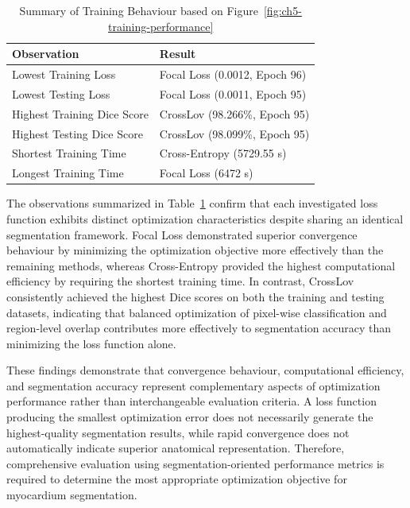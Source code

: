 \begin{table}[htbp]
	\centering
	\caption{Summary of Training Behaviour based on Figure~\ref{fig:ch5-training-performance}}
	\label{tab:ch5-summary-training-behaviour}
	
	\small
	\setlength{\heavyrulewidth}{\lightrulewidth}
	\renewcommand{\arraystretch}{1.3}
	
	\begin{tabular}{ll}
		\toprule
		\textbf{Observation} & \textbf{Result} \\ \midrule
		Lowest Training Loss       & Focal Loss (0.0012, Epoch 96) \\
		Lowest Testing Loss        & Focal Loss (0.0011, Epoch 95) \\
		Highest Training Dice Score & CrossLov (98.266\%, Epoch 95) \\
		Highest Testing Dice Score  & CrossLov (98.099\%, Epoch 95) \\
		Shortest Training Time     & Cross-Entropy (5729.55 s) \\
		Longest Training Time      & Focal Loss (6472 s) \\ \bottomrule
	\end{tabular}
\end{table}

The observations summarized in Table~\ref{tab:ch5-summary-training-behaviour} confirm that each investigated loss function exhibits distinct optimization characteristics despite sharing an identical segmentation framework. Focal Loss demonstrated superior convergence behaviour by minimizing the optimization objective more effectively than the remaining methods, whereas Cross-Entropy provided the highest computational efficiency by requiring the shortest training time. In contrast, CrossLov consistently achieved the highest Dice scores on both the training and testing datasets, indicating that balanced optimization of pixel-wise classification and region-level overlap contributes more effectively to segmentation accuracy than minimizing the loss function alone.

These findings demonstrate that convergence behaviour, computational efficiency, and segmentation accuracy represent complementary aspects of optimization performance rather than interchangeable evaluation criteria. A loss function producing the smallest optimization error does not necessarily generate the highest-quality segmentation results, while rapid convergence does not automatically indicate superior anatomical representation. Therefore, comprehensive evaluation using segmentation-oriented performance metrics is required to determine the most appropriate optimization objective for myocardium segmentation.

